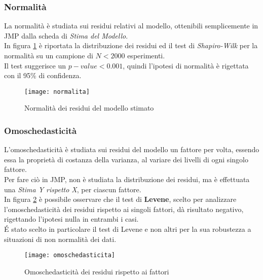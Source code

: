 \subsubsection*{Normalità}
La normalità è studiata sui residui relativi al modello, ottenibili semplicemente
in JMP dalla scheda di \textit{Stima del Modello}.\\
In figura \ref{webserver_normalita} è riportata la distribuzione dei residui ed il test
di \textit{Shapiro-Wilk} per la normalità su un campione di $N<2000$ esperimenti.\\
Il test suggerisce un $p-value<0.001$, quindi l'ipotesi di normalità è rigettata
con il 95\% di confidenza.\\

\begin{figure}[!htbp]
  \centering
  \texttt{[image: normalita]}
  \caption{Normalità dei residui del modello stimato}
  \label{webserver_normalita}
\end{figure}

\clearpage

\subsubsection*{Omoschedasticità}
L'omoschedasticità è studiata sui residui del modello un fattore per volta,
essendo essa la proprietà di costanza della varianza, al variare dei livelli di
ogni singolo fattore.\\
Per fare ciò in JMP, non è studiata la distribuzione dei residui,
ma è effettuata una \textit{Stima Y rispetto X}, per ciascun fattore.\\
In figura \ref{webserver_omoschedasticita} è possibile osservare che il test di \textbf{Levene},
scelto per analizzare l'omoschedasticità dei residui rispetto ai singoli fattori,
dà risultato negativo, rigettando l'ipotesi nulla in entrambi i casi.\\
\'E stato scelto in particolare il test di Levene e non altri per la sua
robustezza a situazioni di non normalità dei dati.\\

\begin{figure}[!htbp]
  \centering
  \texttt{[image: omoschedasticita]}
  \caption{Omoschedasticità dei residui rispetto ai fattori}
  \label{webserver_omoschedasticita}
\end{figure}

\clearpage

